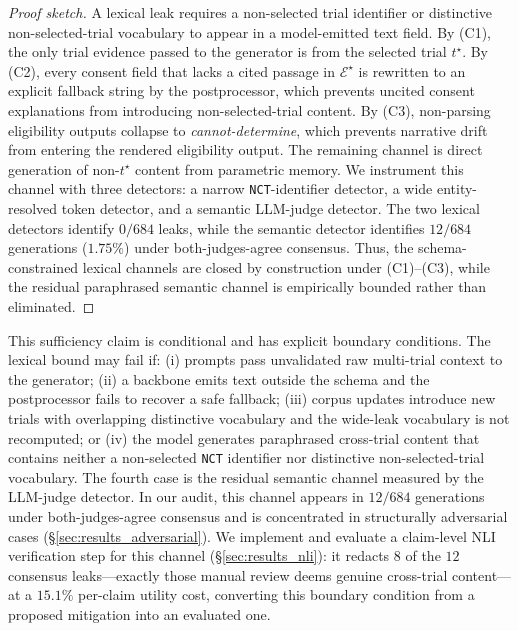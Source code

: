\documentclass[pdflatex,Numbered]{sn-jnl}
\theoremstyle{plain}
\begin{document}
\begin{proof}[Proof sketch]
A lexical leak requires a non-selected trial identifier or distinctive non-selected-trial vocabulary to appear in a model-emitted text field. By (C1), the only trial evidence passed to the generator is from the selected trial $t^\star$. By (C2), every consent field that lacks a cited passage in $\mathcal{E}^\star$ is rewritten to an explicit fallback string by the postprocessor, which prevents uncited consent explanations from introducing non-selected-trial content. By (C3), non-parsing eligibility outputs collapse to \emph{cannot-determine}, which prevents narrative drift from entering the rendered eligibility output. The remaining channel is direct generation of non-$t^\star$ content from parametric memory. We instrument this channel with three detectors: a narrow \texttt{NCT}-identifier detector, a wide entity-resolved token detector, and a semantic LLM-judge detector. The two lexical detectors identify $0/684$ leaks, while the semantic detector identifies $12/684$ generations ($1.75\%$) under both-judges-agree consensus. Thus, the schema-constrained lexical channels are closed by construction under (C1)--(C3), while the residual paraphrased semantic channel is empirically bounded rather than eliminated.
\end{proof}

This sufficiency claim is conditional and has explicit boundary conditions. The lexical bound may fail if: (i) prompts pass unvalidated raw multi-trial context to the generator; (ii) a backbone emits text outside the schema and the postprocessor fails to recover a safe fallback; (iii) corpus updates introduce new trials with overlapping distinctive vocabulary and the wide-leak vocabulary is not recomputed; or (iv) the model generates paraphrased cross-trial content that contains neither a non-selected \texttt{NCT} identifier nor distinctive non-selected-trial vocabulary. The fourth case is the residual semantic channel measured by the LLM-judge detector. In our audit, this channel appears in $12/684$ generations under both-judges-agree consensus and is concentrated in structurally adversarial cases (\S\ref{sec:results_adversarial}). We implement and evaluate a claim-level NLI verification step for this channel (\S\ref{sec:results_nli}): it redacts $8$ of the $12$ consensus leaks---exactly those manual review deems genuine cross-trial content---at a $15.1\%$ per-claim utility cost, converting this boundary condition from a proposed mitigation into an evaluated one.
\end{document}
